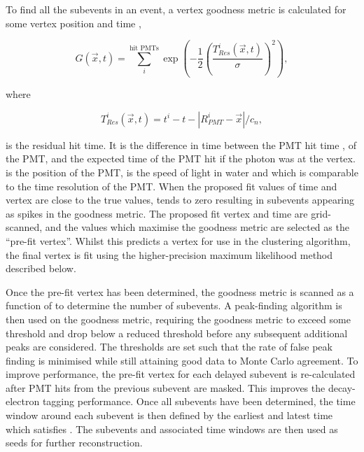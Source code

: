 To find all the subevents in an event, a vertex goodness metric is calculated for some vertex position  and time ,


\begin{equation}
  G(\vec{x},t) = \sum^{\text{hit PMTs}}_{i} \exp \left( - \frac{1}{2} \left( \frac{T_{Res}^{i}(\vec{x},t)}{\sigma} \right)^{2} \right),
\end{equation}

where

\begin{equation}
  T_{Res}^{i}(\vec{x},t) = t^{i} - t - \left| R^{i}_{PMT} - \vec{x} \right|/c_{n},
\end{equation}

is the residual hit time. It is the difference in time between the PMT hit time , of the  PMT, and the expected time of the PMT hit if the photon was at the vertex.  is the position of the  PMT,  is the speed of light in water and  which is comparable to the time resolution of the PMT. When the proposed fit values of time and vertex are close to the true values,  tends to zero resulting in subevents appearing as spikes in the goodness metric. The proposed fit vertex and time are grid-scanned, and the values which maximise the goodness metric are selected as the ``pre-fit vertex''. Whilst this predicts a vertex for use in the clustering algorithm, the final vertex is fit using the higher-precision maximum likelihood method described below.

Once the pre-fit vertex has been determined, the goodness metric is scanned as a function of  to determine the number of subevents. A peak-finding algorithm is then used on the goodness metric, requiring the goodness metric to exceed some threshold and drop below a reduced threshold before any subsequent additional peaks are considered. The thresholds are set such that the rate of false peak finding is minimised while still attaining good data to Monte Carlo agreement. To improve performance, the pre-fit vertex for each delayed subevent is re-calculated after PMT hits from the previous subevent are masked. This improves the decay-electron tagging performance. Once all subevents have been determined, the time window around each subevent is then defined by the earliest and latest time which satisfies . The subevents and associated time windows are then used as seeds for further reconstruction.

